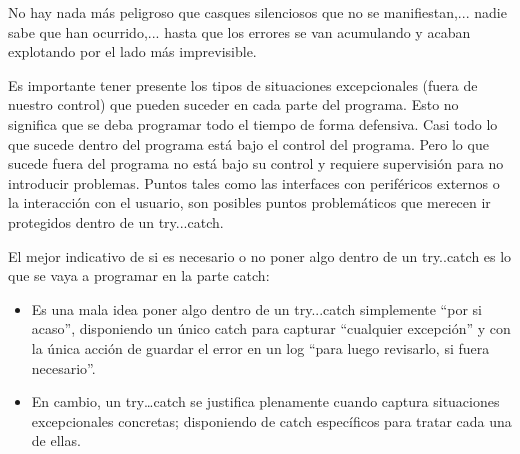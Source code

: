 \documentclass[spanish,12pt,a4paper,final,oneside]{book}
\begin{document}
No hay nada más peligroso que casques silenciosos que no se manifiestan,... nadie sabe que han ocurrido,... hasta que los errores se van acumulando y acaban explotando por el lado más imprevisible.


Es importante tener presente los tipos de situaciones excepcionales (fuera de nuestro control) que pueden suceder en cada parte del programa. Esto no significa que se deba programar todo el tiempo de forma defensiva. Casi todo lo que sucede dentro del programa está bajo el control del programa. Pero lo que sucede fuera del programa no está bajo su control y requiere supervisión para no introducir problemas. Puntos  tales como las interfaces con periféricos externos o la interacción con el usuario, son posibles puntos problemáticos que merecen ir protegidos dentro de un try...catch. 

El mejor indicativo de si es necesario o no poner algo dentro de un try..catch es lo que se vaya a programar en la parte catch:
\begin{itemize}
\item Es una mala idea poner algo dentro de un try...catch simplemente ``por si acaso'', disponiendo un único catch para capturar ``cualquier excepción'' y con la única acción de guardar el error en un log ``para luego revisarlo, si fuera necesario''. 
\item En cambio, un try…catch se justifica plenamente cuando captura situaciones excepcionales concretas; disponiendo de catch específicos para tratar cada una de ellas.
\end{itemize}


\vspace{1cm}
\end{document}
